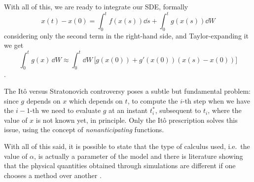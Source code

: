 \documentclass[../../master_thesis_np.tex]{subfiles}
\begin{document}
		With all of this, we are ready to integrate our SDE, formally
		\begin{equation} 
			x(t) - x(0) = \int_{0}^{t} f(x(s)) \dd{s} + \int_{0}^{t} g(x(s)) \dd{W}
		\end{equation} 
		considering only the second term in the right-hand side, and Taylor-expanding it we get
		\begin{equation} 
			\int_0^t g(x) \, \dd{W} \approx \int_0^t \dd{W} \, \big[g(x(0)) + g'(x(0))(x(s) - x(0))\big]
		 \end{equation}.
		 
		 The Itô versus Stratonovich controversy poses a subtle but fundamental problem: since $g$ depends on $x$ which depends on $t$, to compute the $i$-th step when we have the $i-1$-th we need to evaluate $g$ at an instant $t_i^*$, subsequent to $t_i$, where the value of $x$ is not known yet, in principle. Only the Itô prescription solves this issue, using the concept of \emph{nonanticipating} functions.
		 
		 With all of this said, it is possible to state that the type of calculus used, i.e.~the value of $\alpha$, is actually a parameter of the model and there is literature showing that the physical quantities obtained through simulations are different if one chooses a method over another \cite{mannella_ito_2012}.	
		
\end{document}

